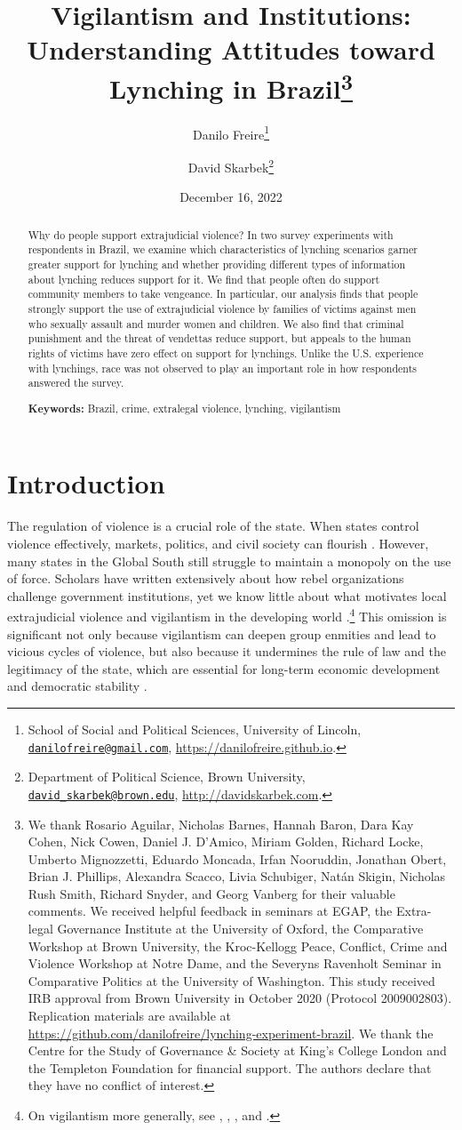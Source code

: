 \documentclass[12pt,a4paper]{article}
\title{Vigilantism and Institutions:\\ Understanding Attitudes toward Lynching in Brazil\footnote{We thank Rosario Aguilar, Nicholas Barnes, Hannah Baron, Dara Kay Cohen, Nick Cowen, Daniel J. D'Amico, Miriam Golden, Richard Locke, Umberto Mignozzetti, Eduardo Moncada, Irfan Nooruddin, Jonathan Obert, Brian J. Phillips, Alexandra Scacco, Livia Schubiger, Natán Skigin, Nicholas Rush Smith, Richard Snyder, and Georg Vanberg for their valuable comments. We received helpful feedback in seminars at EGAP, the Extra-legal Governance Institute at the University of Oxford, the Comparative Workshop at Brown University, the Kroc-Kellogg Peace, Conflict, Crime and Violence Workshop at Notre Dame, and the Severyns Ravenholt Seminar in Comparative Politics at the University of Washington. This study received IRB approval from Brown University in October 2020 (Protocol 2009002803). Replication materials are available at \url{https://github.com/danilofreire/lynching-experiment-brazil}. We thank the Centre for the Study of Governance \& Society at King's College London and the Templeton Foundation for financial support. The authors declare that they have no conflict of interest.}}
\author{Danilo Freire\footnote{School of Social and Political Sciences, University of Lincoln, \href{mailto:danilofreire@gmail.com}{\texttt{danilofreire@gmail.com}}, \url{https://danilofreire.github.io}.} \and David Skarbek\footnote{Department of Political Science, Brown University, \href{mailto:david_skarbek@brown.edu}{\texttt{david\_skarbek@brown.edu}}, \url{http://davidskarbek.com}.}}
\date{December 16, 2022}
\begin{document}
\maketitle

\begin{abstract}
  \doublespacing \noindent Why do people support extrajudicial violence? In two survey experiments with respondents in Brazil, we examine which characteristics of lynching scenarios garner greater support for lynching and whether providing different types of information about lynching reduces support for it. We find that people often do support community members to take vengeance. In particular, our analysis finds that people strongly support the use of extrajudicial violence by families of victims against men who sexually assault and murder women and children. We also find that criminal punishment and the threat of vendettas reduce support, but appeals to the human rights of victims have zero effect on support for lynchings. Unlike the U.S. experience with lynchings, race was not observed to play an important role in how respondents answered the survey.
\vspace{.25cm}

\noindent \textbf{Keywords:} Brazil, crime, extralegal violence, lynching, vigilantism
\vspace{.25cm}

\end{abstract}

\newpage

\section*{Introduction}
\label{sec:introduction}

\doublespacing

The regulation of violence is a crucial role of the state. When states control
violence effectively, markets, politics, and civil society can flourish
\citep{besley2011pillars, north2009violence}. However, many states in the
Global South still struggle to maintain a monopoly on the use of force.
Scholars have written extensively about how rebel organizations challenge
government institutions, yet we know little about what motivates local
extrajudicial violence and vigilantism in the developing world
\citep{bateson2020politics}.\footnote{On vigilantism more generally, see
\citet{cohen2022collective}, \citet{schuberth2013challenging},
\citet{smith2019contradictions}, and \citet{zizumbo2017community}.} This
omission is significant not only because vigilantism can deepen group enmities
and lead to vicious cycles of violence, but also because it undermines the rule
of law and the legitimacy of the state, which are essential for long-term
economic development and democratic stability \citep{jung2020lynching,
tankebe2009self}.
\end{document}

